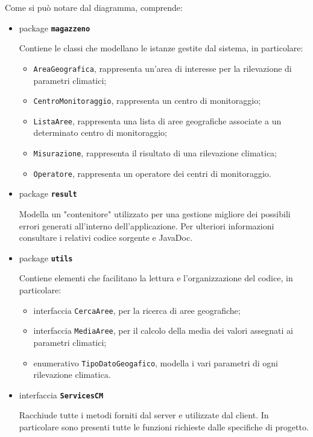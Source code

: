 Come si può notare dal diagramma, comprende:
\begin{itemize}
	\item package \textbf{\texttt{magazzeno}}
		
		Contiene le classi che modellano le istanze gestite dal sistema, in particolare:
		\begin{itemize}
			\item \texttt{AreaGeografica}, rappresenta un'area di interesse per la rilevazione di parametri climatici;
			\item \texttt{CentroMonitoraggio}, rappresenta un centro di monitoraggio;
			\item \texttt{ListaAree}, rappresenta una lista di aree geografiche associate a un determinato centro di monitoraggio;
			\item \texttt{Misurazione}, rappresenta il risultato di una rilevazione climatica;
			\item \texttt{Operatore}, rappresenta un operatore dei centri di monitoraggio.
		\end{itemize}
	\item package \textbf{\texttt{result}}
		
		Modella un "contenitore" utilizzato per una gestione migliore dei possibili errori generati all'interno dell'applicazione.
		Per ulteriori informazioni consultare i relativi codice sorgente e JavaDoc.
	\item package \textbf{\texttt{utils}}
		
		Contiene elementi che facilitano la lettura e l'organizzazione del codice, in particolare:
		\begin{itemize}
			\item interfaccia \texttt{CercaAree}, per la ricerca di aree geografiche;
			\item interfaccia \texttt{MediaAree}, per il calcolo della media dei valori assegnati ai parametri climatici;
			\item enumerativo \texttt{TipoDatoGeogafico}, modella i vari parametri di ogni rilevazione climatica.
		\end{itemize}
	\item interfaccia \textbf{\texttt{ServicesCM}}
	
		Racchiude tutte i metodi forniti dal server e utilizzate dal client. In particolare sono presenti tutte le funzioni richieste dalle specifiche di progetto.
\end{itemize}

\nocite{IuriTex}


